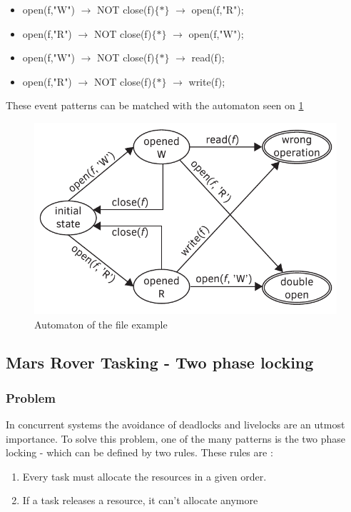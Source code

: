 				\begin{itemize}
					\item open(f,"W") $\rightarrow$ NOT close(f)$\{\ast\}$ $\rightarrow$ open(f,"R");
					\item open(f,"R") $\rightarrow$ NOT close(f)$\{\ast\}$ $\rightarrow$ open(f,"W");
					\item open(f,"W") $\rightarrow$ NOT close(f)$\{\ast\}$ $\rightarrow$ read(f);
					\item open(f,"R") $\rightarrow$ NOT close(f)$\{\ast\}$ $\rightarrow$ write(f);
				\end{itemize}

				These event patterns can be matched with the automaton seen on \cref{fig:cep:fileautomaton}
				
				\begin{figure}[h]
				\centering
				\includegraphics[width=0.7\linewidth]{include/figures/chapter_5/file_example_aut}
				\caption{Automaton of the file example}
				\label{fig:cep:fileautomaton}
				\end{figure}

		
		
		\subsection{Mars Rover Tasking - Two phase locking}
			\subsubsection{Problem}
				In concurrent systems the avoidance of deadlocks and livelocks are an utmost importance.
				To solve this problem, one of the many patterns is  the two phase locking - which can be defined by two rules.
				These rules are : 
				\begin{enumerate}
					\item \label{itm:cep:mp1} Every task must allocate the resources in a given order.
					\item \label{itm:cep:mp2} If a task releases a resource, it can't allocate anymore
				\end{enumerate}

